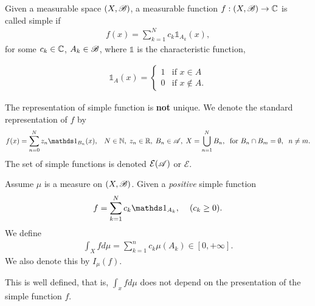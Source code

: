 \begin{definition}
    Given a measurable space $(X,\mathscr{B})$, a measurable function $f:(X,\mathscr{B})\rightarrow \mathbb{C}$ is called simple if 
    \begin{align}
    f(x) = \sum_{k=1}^{N}c_k\mathds 1_{A_k}(x),    
    \end{align}
for some $c_k\in\mathbb{C}$, $A_k\in \mathscr{B}$, where $\mathds 1$ is the characteristic function,

\begin{align}
    \mathds 1_{A}(x)= \begin{cases} 
        1 & \text{if } x\in A \\
        0 & \text{if } x\notin A.
     \end{cases}
\end{align}

The representation of simple function is \textbf{not} unique. We denote the standard representation of
$f$ by \begin{align}
    f(x) = \sum_{n=0}^{N}z_n\mathds 1_{B_n}(x),\hspace{3mm} N\in\mathbb N,\hspace{1mm} z_n\in\R,\hspace{1mm} B_n\in\A,\hspace{1mm} X=\bigcup_{n=1}^N B_n,\hspace{2mm}\text{for } B_n\cap B_m=\emptyset,\hspace{2mm} n\neq m.
\end{align}
The set of simple functions is denoted $\mathcal E(\mathscr{A})$ or $\mathcal E$. 

\end{definition}
\begin{definition}
    Assume $\mu$ is a measure on $(X,\mathscr{B})$. Given a \textit{positive} simple function
    \begin{align}
        f = \sum_{k=1}^{N}c_k\mathds 1_{A_k},\hspace{4mm} (c_k\geq 0).
    \end{align}
    We define \begin{align}
        \int_X fd\mu =\sum_{k=1}^{n}c_k\mu(A_k)\in [0,+\infty].
    \end{align}
    We also denote this by $I_\mu(f)$.
\end{definition}

\begin{lemma}
    This is well defined, that is, $\int_x fd\mu$ does not depend on the presentation of the simple function $f$.
\end{lemma}

